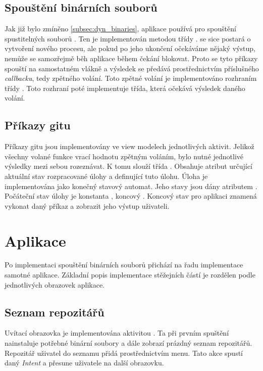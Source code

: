 \subsection{Spouštění binárních souborů}
Jak již bylo zmíněno \ref{subsec:dyn_binaries}, aplikace používá pro spouštění spustitelných souborů . Ten je implementován metodou  třídy .  se sice postará o vytvoření nového procesu, ale pokud po jeho ukončení očekáváme nějaký výstup, nemůže se samozřejmě běh aplikace během čekání blokovat. Proto se tyto příkazy spouští na samostatném vlákně a výsledek se předává prostřednictvím příslušného \emph{callbacku}, tedy zpětného volání. Toto zpětné volání je implementováno rozhraním  třídy . Toto rozhraní poté implementuje třída, která očekává výsledek daného volání.

\subsection{Příkazy gitu}
Příkazy gitu jsou implementovány ve view modelech jednotlivých aktivit. Jelikož všechny volané funkce vrací hodnotu zpětným voláním, bylo nutné jednotlivé výsledky mezi sebou rozeznávat. K tomu slouží třída . Obsahuje atribut  určující aktuální stav rozpracované úlohy a  definující tuto úlohu. Úloha je implementována jako konečný stavový automat. Jeho stavy jsou dány atributem . Počáteční stav úlohy je konstanta , koncový . Koncový stav pro aplikaci znamená vykonat daný příkaz a zobrazit jeho výstup uživateli.

\section{Aplikace}
Po implementaci spouštění binárních souborů přichází na řadu implementace samotné aplikace. Základní popis implementace stěžejních částí je rozdělen podle jednotlivých obrazovek aplikace.

\subsection{Seznam repozitářů}
Uvítací obrazovka je implementována aktivitou . Ta při prvním spuštění nainstaluje potřebné binární soubory a dále zobrazí prázdný seznam repozitářů. Repozitář uživatel do seznamu přidá prostřednictvím menu. Tato akce spustí daný \emph{Intent} a přesune uživatele na další obrazovku.
